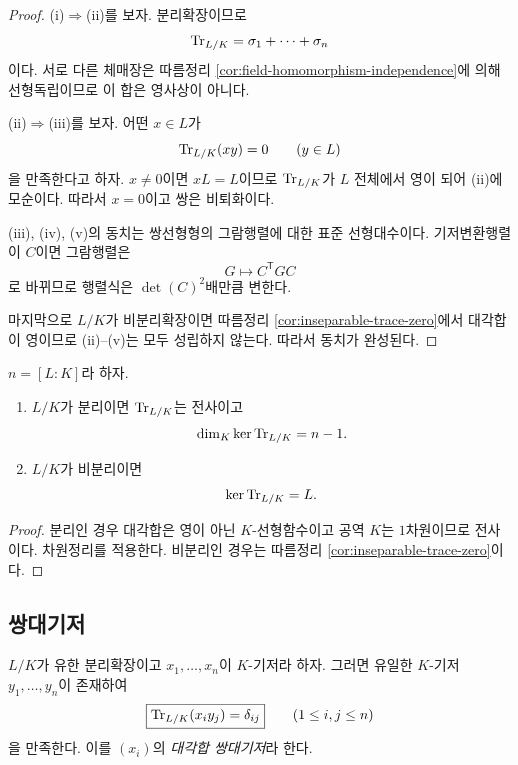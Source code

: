\begin{proof}
(i)$\Rightarrow$(ii)를 보자. 분리확장이므로
\[
  \operatorname{Tr}_{L/K}=\sigma_1+\cdots+\sigma_n
\]
이다. 서로 다른 체매장은 따름정리
\ref{cor:field-homomorphism-independence}에 의해 선형독립이므로
이 합은 영사상이 아니다.

(ii)$\Rightarrow$(iii)를 보자. 어떤 $x\in L$가
\[
  \operatorname{Tr}_{L/K}(xy)=0\qquad(y\in L)
\]
을 만족한다고 하자. $x\ne0$이면 $xL=L$이므로
$\operatorname{Tr}_{L/K}$가 $L$ 전체에서 영이 되어 (ii)에 모순이다.
따라서 $x=0$이고 쌍은 비퇴화이다.

(iii), (iv), (v)의 동치는 쌍선형형의 그람행렬에 대한 표준 선형대수이다.
기저변환행렬이 $C$이면 그람행렬은
\[
  G\longmapsto C^{\mathsf T}GC
\]
로 바뀌므로 행렬식은 $\det(C)^2$배만큼 변한다.

마지막으로 $L/K$가 비분리확장이면
따름정리 \ref{cor:inseparable-trace-zero}에서 대각합이 영이므로
(ii)--(v)는 모두 성립하지 않는다. 따라서 동치가 완성된다.
\end{proof}

\begin{corollary}[대각합의 상과 핵]
\label{cor:trace-kernel-dimension}
$n=[L:K]$라 하자.
\begin{enumerate}[label=(\roman*)]
  \item $L/K$가 분리이면 $\operatorname{Tr}_{L/K}$는 전사이고
  \[
    \dim_K\ker\operatorname{Tr}_{L/K}=n-1.
  \]
  \item $L/K$가 비분리이면
  \[
    \ker\operatorname{Tr}_{L/K}=L.
  \]
\end{enumerate}
\end{corollary}

\begin{proof}
분리인 경우 대각합은 영이 아닌 $K$-선형함수이고 공역 $K$는
$1$차원이므로 전사이다. 차원정리를 적용한다. 비분리인 경우는
따름정리 \ref{cor:inseparable-trace-zero}이다.
\end{proof}

\subsection{쌍대기저}

\begin{corollary}
\label{cor:trace-dual-basis}
$L/K$가 유한 분리확장이고 $x_1,\dots,x_n$이 $K$-기저라 하자.
그러면 유일한 $K$-기저 $y_1,\dots,y_n$이 존재하여
\[
  \boxed{
  \operatorname{Tr}_{L/K}(x_i y_j)=\delta_{ij}}
  \qquad(1\le i,j\le n)
\]
을 만족한다. 이를 $(x_i)$의 \emph{대각합 쌍대기저}라 한다.
\end{corollary}

